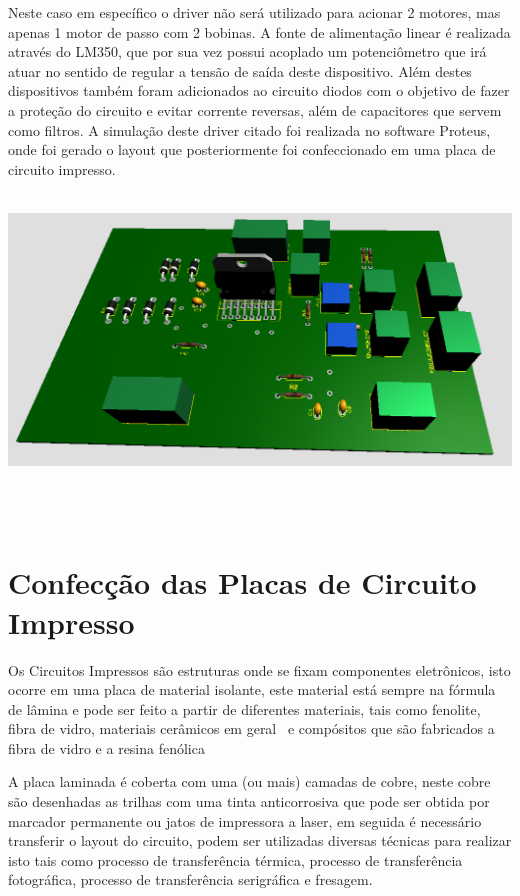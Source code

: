 Neste caso em específico o driver não será utilizado para acionar 2 motores, mas apenas 1 motor de passo com 2 bobinas. A fonte de alimentação linear é realizada através do LM350, que por sua vez possui acoplado um potenciômetro que irá atuar no sentido de regular a tensão de saída deste dispositivo. 
Além destes dispositivos também foram adicionados ao circuito diodos com o objetivo de fazer a proteção do circuito e evitar corrente reversas, além de capacitores que servem como filtros. 
A simulação deste driver citado foi realizada no software Proteus, onde foi gerado o layout que posteriormente foi confeccionado em uma placa de circuito impresso. 

\begin{center}
    \includegraphics[scale=0.5]{figuras/driver3d}
       \label{driver3d}
  \end{center}  

\section{Confecção das Placas de Circuito Impresso}

Os Circuitos Impressos são estruturas onde se fixam componentes eletrônicos, isto ocorre em uma placa de material isolante, este material está sempre na fórmula de lâmina e pode ser feito a partir de diferentes materiais, tais como fenolite, fibra de vidro, materiais cerâmicos em geral  e compósitos que são fabricados a fibra de vidro e a resina fenólica %

A placa laminada é coberta com uma (ou mais) camadas de cobre, neste cobre são desenhadas as trilhas com uma tinta anticorrosiva que pode ser obtida por marcador permanente ou jatos de impressora a laser, em seguida é necessário transferir o layout do circuito, podem ser utilizadas diversas técnicas para realizar isto tais como processo de transferência térmica, processo de transferência fotográfica, processo de transferência serigráfica e fresagem. 

